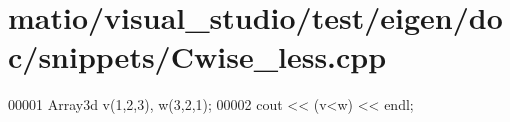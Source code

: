 \hypertarget{matio_2visual__studio_2test_2eigen_2doc_2snippets_2_cwise__less_8cpp_source}{}\section{matio/visual\+\_\+studio/test/eigen/doc/snippets/\+Cwise\+\_\+less.cpp}
\label{matio_2visual__studio_2test_2eigen_2doc_2snippets_2_cwise__less_8cpp_source}

\begin{DoxyCode}
00001 Array3d v(1,2,3), w(3,2,1);
00002 cout << (v<w) << endl;
\end{DoxyCode}
